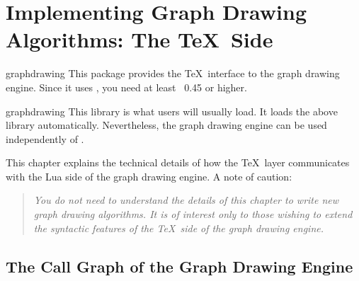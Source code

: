 %
%
%


\section{Implementing Graph Drawing Algorithms: The \TeX\ Side}

{}

\label{section-base-graphdrawing}
\label{section-gd-internals}


\begin{pgflibrary}{graphdrawing}
  This package provides the \TeX\ interface to the graph drawing
  engine. Since it uses \LuaTeX, you need at least \LuaTeX\ 0.45 or 
  higher.
\end{pgflibrary}

\begin{tikzlibrary}{graphdrawing}
  This library is what users will usually load. It loads the above
  library automatically. Nevertheless, the graph drawing engine can be
  used independently of \tikzname.
\end{tikzlibrary}


This chapter explains the technical details of how the \TeX\ layer
communicates with the Lua side of the graph drawing engine. A note of
caution:

\begin{quote}
  \itshape You do not need to understand the details of this
  chapter to write new graph drawing algorithms. It is of interest
  only to those wishing to extend the syntactic features of the \TeX\ side
  of the graph drawing engine.
\end{quote}


\subsection{The Call Graph of the Graph Drawing Engine}

